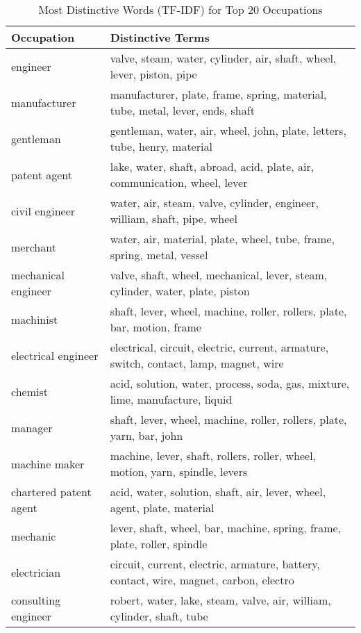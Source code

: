 \begin{table}[H]
\centering
\caption{Most Distinctive Words (TF-IDF) for Top 20 Occupations}
\vspace{5mm}
\renewcommand{\arraystretch}{0.9}
\begin{tabular}{|l|p{12cm}|}
\hline
\textbf{Occupation} & \textbf{Distinctive Terms} \\
\hline
engineer & valve, steam, water, cylinder, air, shaft, wheel, lever, piston, pipe \\
\hline
manufacturer & manufacturer, plate, frame, spring, material, tube, metal, lever, ends, shaft \\
\hline
gentleman & gentleman, water, air, wheel, john, plate, letters, tube, henry, material \\
\hline
patent agent & lake, water, shaft, abroad, acid, plate, air, communication, wheel, lever \\
\hline
civil engineer & water, air, steam, valve, cylinder, engineer, william, shaft, pipe, wheel \\
\hline
merchant & water, air, material, plate, wheel, tube, frame, spring, metal, vessel \\
\hline
mechanical engineer & valve, shaft, wheel, mechanical, lever, steam, cylinder, water, plate, piston \\
\hline
machinist & shaft, lever, wheel, machine, roller, rollers, plate, bar, motion, frame \\
\hline
electrical engineer & electrical, circuit, electric, current, armature, switch, contact, lamp, magnet, wire \\
\hline
chemist & acid, solution, water, process, soda, gas, mixture, lime, manufacture, liquid \\
\hline
manager & shaft, lever, wheel, machine, roller, rollers, plate, yarn, bar, john \\
\hline
machine maker & machine, lever, shaft, rollers, roller, wheel, motion, yarn, spindle, levers \\
\hline
chartered patent agent & acid, water, solution, shaft, air, lever, wheel, agent, plate, material \\
\hline
mechanic & lever, shaft, wheel, bar, machine, spring, frame, plate, roller, spindle \\
\hline
electrician & circuit, current, electric, armature, battery, contact, wire, magnet, carbon, electro \\
\hline
consulting engineer & robert, water, lake, steam, valve, air, william, cylinder, shaft, tube \\

\end{tabular}
\end{table}
